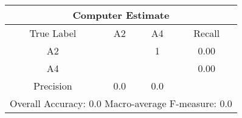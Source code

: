 \begin{tabular}{|c||c|c||c|}
\hline 
\multicolumn{4}{|c|}{Computer Estimate}\\
\hline 
True Label & A2 & A4 & Recall \\
\hline 
A2 &  &1 &  0.00\\
A4 &  & & 0.00\\
\hline 
Precision & 0.0 & 0.0 & \\
\hline 
\multicolumn{4}{|c|}{Overall Accuracy: 0.0 Macro-average F-measure: 0.0}\\
\hline 
\end{tabular} 
